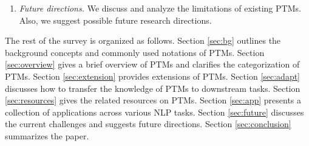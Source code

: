 \documentclass[fleqn]{SCYE-arxiv}
\begin{document}
\begin{multicols}{2}
\begin{enumerate}
\item \textit{Future directions.} We discuss and analyze the limitations of existing PTMs. Also, we suggest possible future research directions.%
\end{enumerate}


The rest of the survey is organized as follows. Section \ref{sec:bg} outlines the background concepts and commonly used notations of PTMs.
Section \ref{sec:overview} gives a brief overview of PTMs and clarifies the categorization of PTMs. Section \ref{sec:extension} provides extensions of PTMs.
Section \ref{sec:adapt} discusses how to transfer the knowledge of PTMs to downstream tasks.
Section \ref{sec:resources} gives the related resources on PTMs.
Section \ref{sec:app}
presents a collection of applications across various NLP tasks.
Section \ref{sec:future} discusses the current challenges and suggests future
directions. Section \ref{sec:conclusion} summarizes the paper.







\end{multicols}
\end{document}
